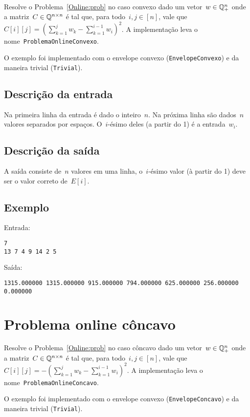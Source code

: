 Resolve o Problema~\ref{Online:prob} no caso convexo dado um vetor~$w \in \mathbb{Q}^n_+$ onde a matriz~$C \in \mathbb{Q}^{n \times n}$ é tal que, para todo~$i,j\in[n]$, vale que~$C[i][j] = (\sum_{k=1}^j w_k - \sum_{k=1}^{i-1} w_i)^2$. A implementação leva o nome~\texttt{ProblemaOnlineConvexo}.

O exemplo foi implementado com o envelope convexo (\texttt{EnvelopeConvexo}) e da maneira trivial (\texttt{Trivial}).

\subsection*{Descrição da entrada}
Na primeira linha da entrada é dado o inteiro~$n$. Na próxima linha são dados~$n$ valores separados por espaços. O~$i$-ésimo deles (a partir do 1) é a entrada~$w_i$.

\subsection*{Descrição da saída}
A saída consiste de~$n$ valores em uma linha, o~$i$-ésimo valor (à partir do 1) deve ser o valor correto de~$E[i]$.

\subsection*{Exemplo}
Entrada:
\begin{verbatim}
7
13 7 4 9 14 2 5
\end{verbatim}
Saída:
\begin{verbatim}
1315.000000 1315.000000 915.000000 794.000000 625.000000 256.000000 0.000000
\end{verbatim}


\section{Problema online côncavo} \label{ProblemaOnlineConcavo}

Resolve o Problema~\ref{Online:prob} no caso côncavo dado um vetor~$w \in \mathbb{Q}^n_+$ onde a matriz~$C \in \mathbb{Q}^{n \times n}$ é tal que, para todo~$i,j\in[n]$, vale que~$C[i][j] = -(\sum_{k=1}^j w_k - \sum_{k=1}^{i-1} w_i)^2$. A implementação leva o nome~\texttt{ProblemaOnlineConcavo}.

O exemplo foi implementado com o envelope convexo (\texttt{EnvelopeConcavo}) e da maneira trivial (\texttt{Trivial}).

